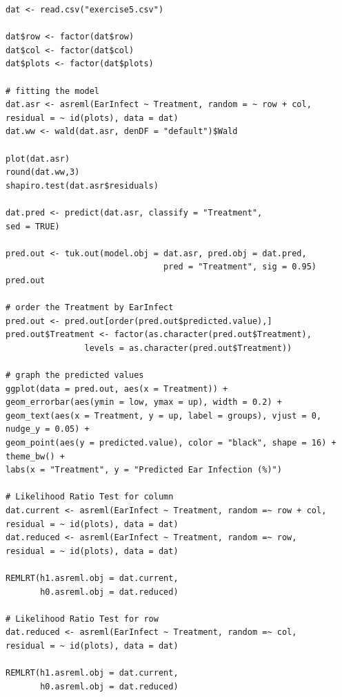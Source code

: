 \documentclass[a4paper, 10pt, fleqn, twosided]{memoir}
\begin{document}

\begin{tcolorbox}[title = Exercise 11 code]
\begin{verbatim}
dat <- read.csv("exercise5.csv")

dat$row <- factor(dat$row)
dat$col <- factor(dat$col)
dat$plots <- factor(dat$plots)

# fitting the model
dat.asr <- asreml(EarInfect ~ Treatment, random = ~ row + col,
residual = ~ id(plots), data = dat)
dat.ww <- wald(dat.asr, denDF = "default")$Wald

plot(dat.asr)
round(dat.ww,3)
shapiro.test(dat.asr$residuals)

dat.pred <- predict(dat.asr, classify = "Treatment",
sed = TRUE)

pred.out <- tuk.out(model.obj = dat.asr, pred.obj = dat.pred,
                                pred = "Treatment", sig = 0.95)
pred.out

# order the Treatment by EarInfect
pred.out <- pred.out[order(pred.out$predicted.value),]
pred.out$Treatment <- factor(as.character(pred.out$Treatment),
                levels = as.character(pred.out$Treatment))
 
# graph the predicted values 
ggplot(data = pred.out, aes(x = Treatment)) +
geom_errorbar(aes(ymin = low, ymax = up), width = 0.2) +
geom_text(aes(x = Treatment, y = up, label = groups), vjust = 0, nudge_y = 0.05) +
geom_point(aes(y = predicted.value), color = "black", shape = 16) + theme_bw() +
labs(x = "Treatment", y = "Predicted Ear Infection (%)")

# Likelihood Ratio Test for column
dat.current <- asreml(EarInfect ~ Treatment, random =~ row + col,
residual = ~ id(plots), data = dat)
dat.reduced <- asreml(EarInfect ~ Treatment, random =~ row,
residual = ~ id(plots), data = dat)

REMLRT(h1.asreml.obj = dat.current,
       h0.asreml.obj = dat.reduced)

# Likelihood Ratio Test for row
dat.reduced <- asreml(EarInfect ~ Treatment, random =~ col,
residual = ~ id(plots), data = dat)

REMLRT(h1.asreml.obj = dat.current,
       h0.asreml.obj = dat.reduced)
\end{verbatim}
\end{tcolorbox}
\end{document}
